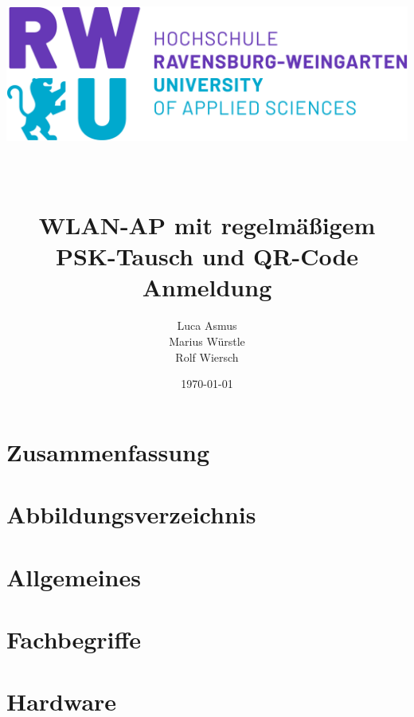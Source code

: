 \documentclass[a4paper,11pt,singlespacing]{article}
\begin{document}
	\setlength{\parindent}{0ex}
	
	\begin{titlepage}
		\author{Luca Asmus\\ Marius Würstle\\Rolf Wiersch}
		\title{\includegraphics[scale=0.3]{rwu_logo_hor-lila-cyan_rgb_0} \\ ~\\ ~\\ WLAN-AP mit regelmäßigem PSK-Tausch und QR-Code Anmeldung \vspace{8cm}}
		\date{\today}
		\maketitle
		\thispagestyle{empty}
    	\end{titlepage}
    	
    	\section{Zusammenfassung}
    	\tableofcontents
    	
    	\section{Abbildungsverzeichnis}
    	\listoffigures
    	\newpage
    	
    	\section{Allgemeines}
    	
    	\section{Fachbegriffe}
    	
    	\section{Hardware}
\end{document}
